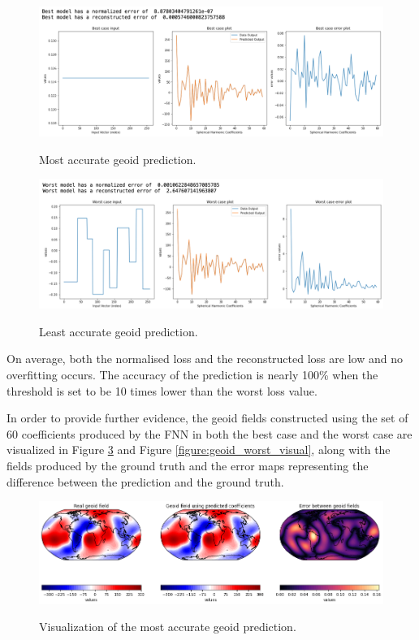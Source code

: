 \begin{figure}[H]
    \caption{Most accurate geoid prediction.}
    \includegraphics[scale=0.6]{figures/geoid_images/Geoid_Best.png}
    \label{figure:geoid_best}
\end{figure}

\begin{figure}[H]
    \caption{Least accurate geoid prediction.}
    \includegraphics[scale=0.6]{figures/geoid_images/Geoid_Worst.png}
    \label{figure:geoid_worst}
\end{figure}

On average, both the normalised loss and the reconstructed loss are low and no overfitting occurs. The accuracy of the prediction is nearly 100\% when the threshold is set to be 10 times lower than the worst loss value. 

In order to provide further evidence, the geoid fields constructed using the set of 60 coefficients produced by the FNN in both the best case and the worst case are visualized in Figure \ref{figure:geoid_best_visual} and Figure \ref{figure:geoid_worst_visual}, along with the fields produced by the ground truth and the error maps representing the difference between the prediction and the ground truth.

\begin{figure}[H]
    \caption{Visualization of the most accurate geoid prediction.}
    \includegraphics[scale=0.4]{figures/geoid_images/Geoid_Best_visualization.png}
    \label{figure:geoid_best_visual}
\end{figure}

